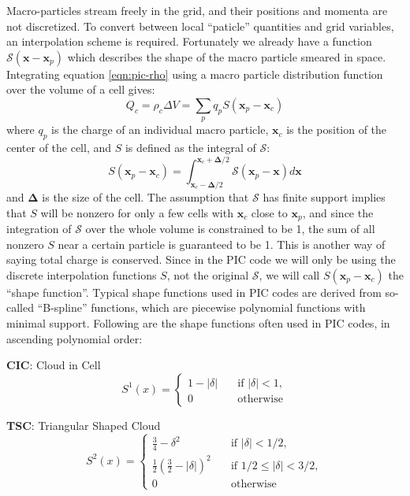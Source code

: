 Macro-particles stream freely in the grid, and their positions and momenta are
not discretized. To convert between local ``paticle'' quantities and grid
variables, an interpolation scheme is required. Fortunately we already have a
function $\mathcal{S}(\mathbf{x} - \mathbf{x}_p)$ which describes the shape of
the macro particle smeared in space. Integrating equation \eqref{eqn:pic-rho}
using a macro particle distribution function over the volume of a cell gives:
\begin{equation}
  \label{eqn:rho-cell}
  Q_{c} = \rho_{c}\Delta V = \sum_pq_pS(\mathbf{x}_p-\mathbf{x}_{c})
\end{equation}
where $q_p$ is the charge of an individual macro particle, $\mathbf{x}_{c}$ is
the position of the center of the cell, and $S$ is defined as
the integral of $\mathcal{S}$:
\begin{equation}
  \label{eqn:weight-function}
  S(\mathbf{x}_p - \mathbf{x}_c) = \int_{\mathbf{x}_c - \bm{\Delta}/2}^{\mathbf{x}_c + \bm{\Delta}/2} \mathcal{S}(\mathbf{x}_p - \mathbf{x})d\mathbf{x}
\end{equation}
and $\bm{\Delta}$ is the size of the cell. The assumption that $\mathcal{S}$ has
finite support implies that $S$ will be nonzero for only a few cells with
$\mathbf{x}_{c}$ close to $\mathbf{x}_{p}$, and since the integration of
$\mathcal{S}$ over the whole volume is constrained to be 1, the sum of all
nonzero $S$ near a certain particle is guaranteed to be 1. This is another way
of saying total charge is conserved. Since in the PIC code we will only be
using the discrete interpolation functions $S$, not the original $\mathcal{S}$,
we will call $S(\mathbf{x}_p - \mathbf{x}_c)$ the ``shape function''.
Typical shape functions used in PIC codes are derived from so-called
``B-spline'' functions, which are piecewise polynomial functions with minimal
support. Following are the shape functions often used in PIC codes, in ascending
polynomial order:

\textbf{CIC}: Cloud in Cell
\begin{equation}
  \label{eq:first-order-deposit}
  S^1(x) = \begin{cases}
    \displaystyle 1 - |\delta| & \quad \text{if } |\delta| < 1, \\
    \displaystyle 0            & \quad \text{otherwise}
  \end{cases}
\end{equation}

\textbf{TSC}: Triangular Shaped Cloud
\begin{equation}
  \label{eq:second-order-deposit}
  S^2(x) =
  \begin{cases}
    \displaystyle \frac{3}{4} - \delta^2 & \quad \text{if } |\delta| < 1/2, \\
    \displaystyle \frac{1}{2} \left( \frac{3}{2} - |\delta| \right)^2 & \quad \text{if } 1/2 \leq |\delta| < 3/2, \\
    \displaystyle 0                      & \quad \text{otherwise}
  \end{cases}
\end{equation}

